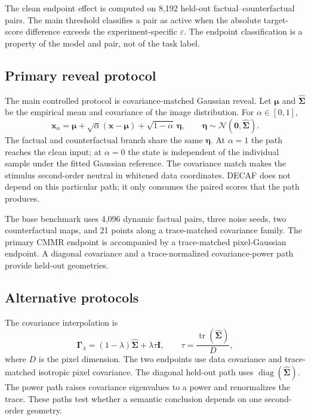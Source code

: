 The clean endpoint effect is computed on 8,192 held-out factual--counterfactual pairs. The main threshold classifies a pair as active when the absolute target-score difference exceeds the experiment-specific $\varepsilon$. The endpoint classification is a property of the model and pair, not of the task label.

\subsection{Primary reveal protocol}
\label{app:cmmr}

The main controlled protocol is covariance-matched Gaussian reveal. Let $\boldsymbol\mu$ and $\widehat{\boldsymbol\Sigma}$ be the empirical mean and covariance of the image distribution. For $\alpha\in[0,1]$,
\begin{equation}
\mathbf{x}_{\alpha}
=
\boldsymbol\mu
+
\sqrt{\alpha}(\mathbf{x}-\boldsymbol\mu)
+
\sqrt{1-\alpha}\,\boldsymbol\eta,
\qquad
\boldsymbol\eta\sim\mathcal N(\mathbf{0},\widehat{\boldsymbol\Sigma}).
\label{eq:cmmr-path}
\end{equation}
The factual and counterfactual branch share the same $\boldsymbol\eta$. At $\alpha=1$ the path reaches the clean input; at $\alpha=0$ the state is independent of the individual sample under the fitted Gaussian reference. The covariance match makes the stimulus second-order neutral in whitened data coordinates. DECAF does not depend on this particular path; it only consumes the paired scores that the path produces.

The base benchmark uses 4,096 dynamic factual pairs, three noise seeds, two counterfactual maps, and 21 points along a trace-matched covariance family. The primary CMMR endpoint is accompanied by a trace-matched pixel-Gaussian endpoint. A diagonal covariance and a trace-normalized covariance-power path provide held-out geometries.

\subsection{Alternative protocols}

The covariance interpolation is
\[
\boldsymbol\Gamma_{\lambda}
=(1-\lambda)\widehat{\boldsymbol\Sigma}
+
\lambda\tau\mathbf I,
\qquad
\tau=\frac{\operatorname{tr}(\widehat{\boldsymbol\Sigma})}{D},
\]
where $D$ is the pixel dimension. The two endpoints use data covariance and trace-matched isotropic pixel covariance. The diagonal held-out path uses $\operatorname{diag}(\widehat{\boldsymbol\Sigma})$. The power path raises covariance eigenvalues to a power and renormalizes the trace. These paths test whether a semantic conclusion depends on one second-order geometry.

